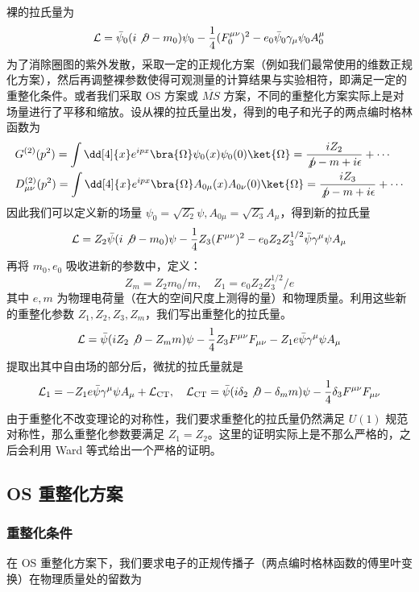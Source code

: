 

裸的拉氏量为
\begin{equation}
\begin{aligned}
\mathcal{L}=
\bar{\psi}_0 (i\not\partial -m_0)\psi_0 -\frac{1}{4}(F_0^{\mu\nu})^2 - e_0\bar\psi_0 \gamma_\mu\psi_0 A_0^\mu
\end{aligned}
\end{equation}
为了消除圈图的紫外发散，采取一定的正规化方案（例如我们最常使用的维数正规化方案），然后再调整裸参数使得可观测量的计算结果与实验相符，即满足一定的重整化条件。或者我们采取 OS 方案或 $\overline{MS}$ 方案，不同的重整化方案实际上是对场量进行了平移和缩放。设从裸的拉氏量出发，得到的电子和光子的两点编时格林函数为
\begin{equation}
\begin{aligned}
&G^{(2)}(p^2)=\int\dd[4]{x} e^{ipx} \bra{\Omega}\psi_0(x)\psi_0(0)\ket{\Omega}=\frac{iZ_2}{\not p-m+i\epsilon} + \cdots\\
&D_{\mu\nu}^{(2)}(p^2)=\int\dd[4]{x} e^{ipx} \bra{\Omega}A_{0\mu}(x)A_{0\nu}(0)\ket{\Omega}=\frac{iZ_3}{\not p-m+i\epsilon}+\cdots
\end{aligned}
\end{equation}
因此我们可以定义新的场量 $\psi_0=\sqrt{Z_2} \psi,A_{0\mu} = \sqrt{Z_3} A_\mu$，得到新的拉氏量
\begin{equation}
\mathcal{L} = Z_2\bar\psi (i\not\partial - m_0)\psi - \frac{1}{4}Z_3 (F^{\mu\nu})^2-e_0Z_2Z_3^{1/2} \bar\psi \gamma^\mu\psi A_\mu
\end{equation}
再将 $m_0,e_0$ 吸收进新的参数中，定义：
\begin{equation}
Z_m = Z_2 m_0 / m,\quad Z_1 = e_0Z_2Z_3^{1/2} / e
\end{equation}
其中 $e,m$ 为物理电荷量（在大的空间尺度上测得的量）和物理质量。利用这些新的重整化参数 $Z_1,Z_2,Z_3,Z_m$，我们写出重整化的拉氏量。
\begin{equation}
\begin{aligned}
\mathcal{L} = \bar\psi (iZ_2\not\partial - Z_m m)\psi -\frac{1}{4}Z_3F^{\mu\nu}F_{\mu\nu}-Z_1 e\bar\psi \gamma^\mu \psi A_\mu
\end{aligned}
\end{equation}
提取出其中自由场的部分后，微扰的拉氏量就是
\begin{equation}
\mathcal{L}_1 = - Z_1 e \bar\psi \gamma^\mu\psi A_\mu + \mathcal{L}_\text{CT},\quad \mathcal{L}_\text{CT} = \bar\psi (i\delta_2 \not\partial - \delta_m m)\psi - \frac{1}{4}\delta_3 F^{\mu\nu}F_{\mu\nu}
\end{equation}
由于重整化不改变理论的对称性，我们要求重整化的拉氏量仍然满足 $U(1)$ 规范对称性，那么重整化参数要满足 $Z_1=Z_2$。这里的证明实际上是不那么严格的，之后会利用 Ward 等式给出一个严格的证明。
\subsection{OS 重整化方案}
\subsubsection{重整化条件}
在 OS 重整化方案下，我们要求电子的正规传播子（两点编时格林函数的傅里叶变换）在物理质量处的留数为